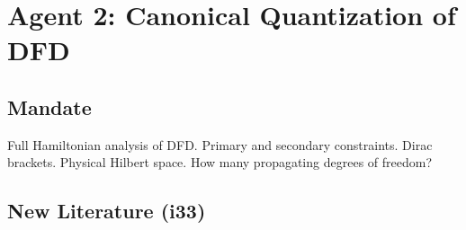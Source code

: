 \documentclass[11pt,a4paper]{article}
\begin{document}
\newpage

\section{Agent 2: Canonical Quantization of DFD}
\label{sec:agent2}

\subsection{Mandate}

Full Hamiltonian analysis of DFD. Primary and secondary constraints. Dirac brackets. Physical Hilbert space. How many propagating degrees of freedom?

\subsection{New Literature (i33)}
\end{document}
